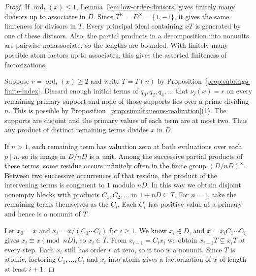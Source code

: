 \documentclass{article}
\DeclareMathOperator{\ord}{ord}
\theoremstyle{remark}
\begin{document}
\begin{proof}
    If $\ord_t(x) \le 1$, Lemma~\ref{lem:low-order-divisors} gives finitely many divisors up to associates in $D$.
    Since $T^\times = D^\times = \{1, -1\}$, it gives the same finiteness for divisors in $T$.
    Every principal ideal containing $xT$ is generated by one of these divisors.
    Also, the partial products in a decomposition into nonunits are pairwise nonassociate, so the lengths are bounded.
    With finitely many possible atom factors up to associates, this gives the asserted finiteness of factorizations.

    Suppose $r = \ord_t(x) \ge 2$ and write $T = T(n)$ by Proposition~\ref{prop:subrings-finite-index}.
    Discard enough initial terms of $q_0, q_2, q_4, \ldots$ that $\nu_j(x) = r$ on every remaining primary support and none of those supports lies over a prime dividing $n$.
    This is possible by Proposition~\ref{prop:simultaneous-realization}(1).
    The supports are disjoint and the primary values of each term are at most two.
    Thus any product of distinct remaining terms divides $x$ in $D$.

    If $n > 1$, each remaining term has valuation zero at both evaluations over each $p \mid n$, so its image in $D/nD$ is a unit.
    Among the successive partial products of these terms, some residue occurs infinitely often in the finite group $(D/nD)^\times$.
    Between two successive occurrences of that residue, the product of the intervening terms is congruent to $1$ modulo $nD$.
    In this way we obtain disjoint nonempty blocks with products $C_1, C_2, \ldots$ in $1 + nD \subseteq T$.
    For $n = 1$, take the remaining terms themselves as the $C_i$.
    Each $C_i$ has positive value at a primary and hence is a nonunit of $T$.

    Let $x_0 = x$ and $x_i = x/(C_1 \cdots C_i)$ for $i \ge 1$.
    We know $x_i \in D$, and $x = x_i C_1 \cdots C_i$ gives $x_i \equiv x \pmod{nD}$, so $x_i \in T$.
    From $x_{i - 1} = C_i x_i$ we obtain $x_{i - 1}T \subsetneq x_iT$ at every step.
    Each $x_i$ still has order $r$ at zero, so it too is a nonunit.
    Since $T$ is atomic, factoring $C_1, \ldots, C_i$ and $x_i$ into atoms gives a factorization of $x$ of length at least $i + 1$.
\end{proof}
\end{document}
